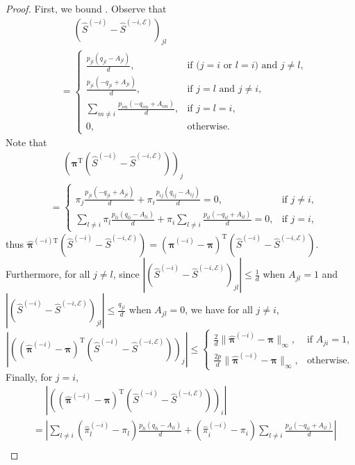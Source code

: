 \documentclass[sigconf,nonacm,pbalance]{acmart}
\newcommand{\tran}{{\mathrm{T}}}
\newcommand{\circled}[1]{
    \tikz[baseline=(char.base)]{\node[shape=circle, draw, inner sep=0pt,minimum size=9pt] (char) {#1};}
}
\begin{document}
\begin{proof}
First, we bound \circled{h}. Observe that
\begin{align}
    &\phantom{{}={}} (\hat{S}^{(-i)}-\hat{S}^{(-i,\mathcal{E})})_{jl} \\
    &= \begin{cases}
        \frac{p_{jl}(q_{jl}-A_{jl})}{d}, & \text{if (} j=i \text{ or } l=i \text{) and } j\neq l, \\
        \frac{p_{ji}(-q_{ji}+A_{ji})}{d}, & \text{if } j=l \text{ and } j\neq i, \\
        \sum_{m\neq i}\frac{p_{im}(-q_{im}+A_{im})}{d}, &\text{if } j=l=i, \\
        0, & \text{otherwise}.
    \end{cases}
\end{align}
Note that
\begin{align}
&\phantom{{}={}}(\bm{\pi}^\tran(\hat{S}^{(-i)}-\hat{S}^{(-i,\mathcal{E})}))_{j} \\
&= \begin{cases}
    \pi_j \frac{p_{ji}(-q_{ji}+A_{ji})}{d} + \pi_i \frac{p_{ij}(q_{ij}-A_{ij})}{d} = 0, & \text{if } j \neq i, \\
    \sum_{l\neq i} \pi_l \frac{p_{li}(q_{li}-A_{li})}{d} + \pi_i \sum_{l\neq i} \frac{p_{il}(-q_{il}+A_{il})}{d} = 0, & \text{if } j=i,
\end{cases}
\end{align}
thus $\hat{\bm{\pi}}^{(-i)\tran}(\hat{S}^{(-i)}-\hat{S}^{(-i,\mathcal{E})})=(\hat{\bm{\pi}}^{(-i)}-\bm{\pi})^\tran(\hat{S}^{(-i)}-\hat{S}^{(-i,\mathcal{E})})$.
Furthermore, for all $j \neq l$, since $|(\hat{S}^{(-i)}-\hat{S}^{(-i,\mathcal{E})})_{jl}| \leq \frac{1}{d}$ when $A_{jl}=1$ and $|(\hat{S}^{(-i)}-\hat{S}^{(-i,\mathcal{E})})_{jl}| \leq \frac{q_{jl}}{d}$ when $A_{jl}=0$, we have for all $j\neq i$,
\begin{equation}
\left|((\hat{\bm{\pi}}^{(-i)}-\bm{\pi})^\tran(\hat{S}^{(-i)}-\hat{S}^{(-i,\mathcal{E})}))_j\right| \leq \begin{cases}
    \frac{2}{d} \|\hat{\bm{\pi}}^{(-i)}-\bm{\pi}\|_\infty, & \text{if } A_{ji} = 1, \\
    \frac{2p}{d} \|\hat{\bm{\pi}}^{(-i)}-\bm{\pi}\|_\infty, &\text{otherwise.}
\end{cases}
\end{equation}
Finally, for $j=i$,
\begin{align}
&\phantom{{}={}} \left|((\hat{\bm{\pi}}^{(-i)}-\bm{\pi})^\tran(\hat{S}^{(-i)}-\hat{S}^{(-i,\mathcal{E})}))_i\right| \\
&= \left|\sum_{l\neq i} (\hat{\pi}^{(-i)}_l-\pi_l) \frac{p_{li}(q_{li}-A_{li})}{d} + (\hat{\pi}^{(-i)}_i-\pi_i) \sum_{l\neq i} \frac{p_{il}(-q_{il}+A_{il})}{d} \right| \\

\end{align}
\end{proof}
\end{document}
